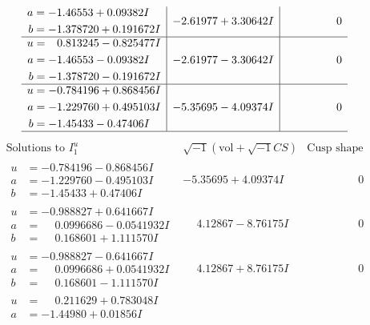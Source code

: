 \documentclass[1p]{elsarticle_modified}
\theoremstyle{definition}
\newcommand{\I}{\sqrt{-1}}
\begin{document}
$$\begin{array}{c|c|c}
\begin{aligned}
a &= -1.46553 + 0.09382 I \\
b &= -1.378720 + 0.191672 I\end{aligned}
 & -2.61977 + 3.30642 I & \phantom{-0.000000 } 0 \\ \hline\begin{aligned}
u &= \phantom{-}0.813245 - 0.825477 I \\
a &= -1.46553 - 0.09382 I \\
b &= -1.378720 - 0.191672 I\end{aligned}
 & -2.61977 - 3.30642 I & \phantom{-0.000000 } 0 \\ \hline\begin{aligned}
u &= -0.784196 + 0.868456 I \\
a &= -1.229760 + 0.495103 I \\
b &= -1.45433 - 0.47406 I\end{aligned}
 & -5.35695 - 4.09374 I & \phantom{-0.000000 } 0\\
 \hline 
 \end{array}$$\newpage$$\begin{array}{c|c|c}  
\text{Solutions to }I^u_{1}& \I (\text{vol} + \sqrt{-1}CS) & \text{Cusp shape}\\
 \hline 
\begin{aligned}
u &= -0.784196 - 0.868456 I \\
a &= -1.229760 - 0.495103 I \\
b &= -1.45433 + 0.47406 I\end{aligned}
 & -5.35695 + 4.09374 I & \phantom{-0.000000 } 0 \\ \hline\begin{aligned}
u &= -0.988827 + 0.641667 I \\
a &= \phantom{-}0.0996686 - 0.0541932 I \\
b &= \phantom{-}0.168601 + 1.111570 I\end{aligned}
 & \phantom{-}4.12867 - 8.76175 I & \phantom{-0.000000 } 0 \\ \hline\begin{aligned}
u &= -0.988827 - 0.641667 I \\
a &= \phantom{-}0.0996686 + 0.0541932 I \\
b &= \phantom{-}0.168601 - 1.111570 I\end{aligned}
 & \phantom{-}4.12867 + 8.76175 I & \phantom{-0.000000 } 0 \\ \hline\begin{aligned}
u &= \phantom{-}0.211629 + 0.783048 I \\
a &= -1.44980 + 0.01856 I \\

\end{aligned}
\end{array}$$
\end{document}
